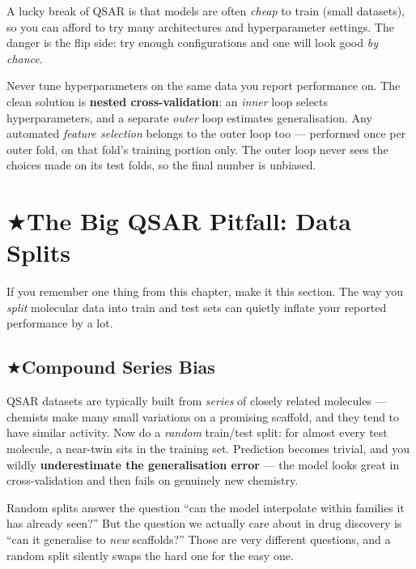 \documentclass[11pt, oneside]{book}
\makeatletter
\newcommand{\starglyph}{\textcolor{stargold}{\ensuremath{\bigstar}}}
\newcommand{\starsec}[1]{%
  \texorpdfstring{\starglyph\hspace{0.4em}\textcolor{star@frame}{#1}}{#1}}
\makeatother
\begin{document}
A lucky break of QSAR is that models are often \emph{cheap} to train (small
datasets), so you can afford to try many architectures and hyperparameter
settings. The danger is the flip side: try enough configurations and one will look
good \emph{by chance}.

\begin{notebox}[title={Hyperparameter selection bias $\to$ use nested CV}]
Never tune hyperparameters on the same data you report performance on. The clean
solution is \textbf{nested cross-validation}: an \emph{inner} loop selects
hyperparameters, and a separate \emph{outer} loop estimates generalisation. Any
automated \emph{feature selection} belongs to the outer loop too --- performed
once per outer fold, on that fold's training portion only. The outer loop never
sees the choices made on its test folds, so the final number is unbiased.
\end{notebox}

\section{\starsec{The Big QSAR Pitfall: Data Splits}}

If you remember one thing from this chapter, make it this section. The way you
\emph{split} molecular data into train and test sets can quietly inflate your
reported performance by a lot.

\subsection{\starsec{Compound Series Bias}}

QSAR datasets are typically built from \emph{series} of closely related molecules
--- chemists make many small variations on a promising scaffold, and they tend to
have similar activity. Now do a \emph{random} train/test split: for almost every
test molecule, a near-twin sits in the training set. Prediction becomes trivial,
and you wildly \textbf{underestimate the generalisation error} --- the model looks
great in cross-validation and then fails on genuinely new chemistry.

\begin{intbox}
Random splits answer the question ``can the model interpolate within families it
has already seen?'' But the question we actually care about in drug discovery is
``can it generalise to \emph{new} scaffolds?'' Those are very different questions,
and a random split silently swaps the hard one for the easy one.
\end{intbox}
\end{document}
